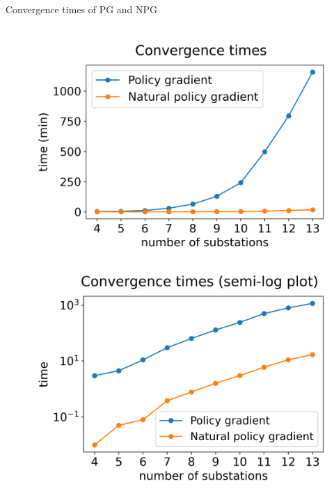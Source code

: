 \documentclass[10pt, aspectratio=169, compress, protectframetitle, handout]{beamer}
\begin{document}
\begin{frame}{Convergence times of PG and NPG}

    \begin{figure}
        \centering
        \mbox{
            \hspace*{-15pt}\includegraphics[scale=0.5]{figures/times_graph.png}
            \hspace*{-5pt}\includegraphics[scale=0.5]{figures/times_graph_log.png}
        }
    \end{figure}
    
\end{frame}
\end{document}
